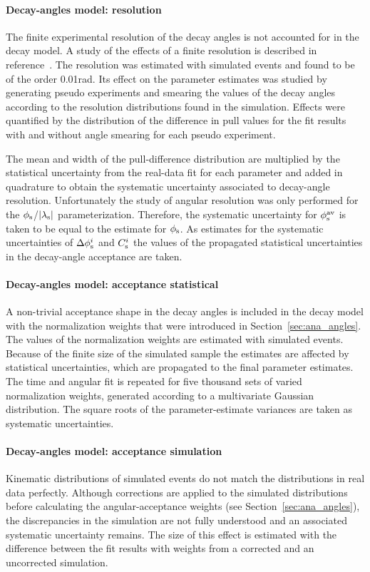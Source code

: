 \paragraph{Decay-angles model: resolution}
The finite experimental resolution of the decay angles is not accounted for in the decay model. A study of the effects of a finite
resolution is described in reference~\cite{LHCb-ANA-2014-039}. The resolution was estimated with simulated events and found to be of the
order 0.01\unitsp{}rad. Its effect on the parameter estimates was studied by generating pseudo experiments and smearing the values of the
decay angles according to the resolution distributions found in the simulation. Effects were quantified by the distribution of the
difference in pull values for the fit results with and without angle smearing for each pseudo experiment.

The mean and width of the pull-difference distribution are multiplied by the statistical uncertainty from the real-data fit for each
parameter and added in quadrature to obtain the systematic uncertainty associated to decay-angle resolution. Unfortunately the study of
angular resolution was only performed for the $\phi_\text{s}$/$|{\lambda_{\text{s}}}|$ parameterization. Therefore, the systematic uncertainty for $\phi_\text{s}^{\text{av}}$ is
taken to be equal to the estimate for $\phi_\text{s}$. As estimates for the systematic uncertainties of $\Delta\phi_\text{s}^{i}$ and $C_\text{s}^{i}$ the values of the
propagated statistical uncertainties in the decay-angle acceptance are taken.

\paragraph{Decay-angles model: acceptance statistical}
A non-trivial acceptance shape in the decay angles is included in the decay model with the normalization weights that were introduced in
Section~\ref{sec:ana_angles}. The values of the normalization weights are estimated with simulated events. Because of the finite size of
the simulated sample the estimates are affected by statistical uncertainties, which are propagated to the final parameter estimates. The
time and angular fit is repeated for five thousand sets of varied normalization weights, generated according to a multivariate Gaussian
distribution. The square roots of the parameter-estimate variances are taken as systematic uncertainties.

\paragraph{Decay-angles model: acceptance simulation}
Kinematic distributions of simulated events do not match the distributions in real data perfectly. Although corrections are applied to the
simulated distributions before calculating the angular-acceptance weights (see Section~\ref{sec:ana_angles}), the discrepancies in the
simulation are not fully understood and an associated systematic uncertainty remains. The size of this effect is estimated with the
difference between the fit results with weights from a corrected and an uncorrected simulation.
